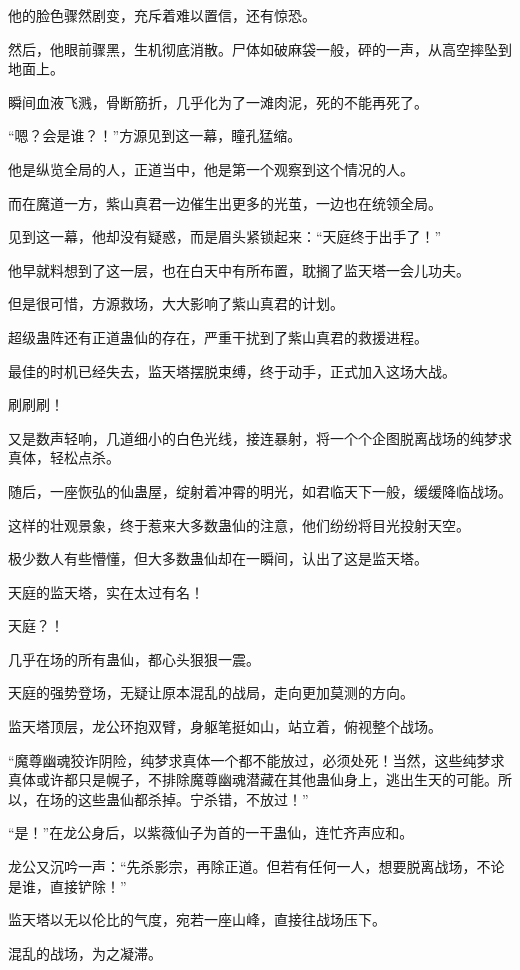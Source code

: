 \begin{this_body}
他的脸色骤然剧变，充斥着难以置信，还有惊恐。

然后，他眼前骤黑，生机彻底消散。尸体如破麻袋一般，砰的一声，从高空摔坠到地面上。

瞬间血液飞溅，骨断筋折，几乎化为了一滩肉泥，死的不能再死了。

“嗯？会是谁？！”方源见到这一幕，瞳孔猛缩。

他是纵览全局的人，正道当中，他是第一个观察到这个情况的人。

而在魔道一方，紫山真君一边催生出更多的光茧，一边也在统领全局。

见到这一幕，他却没有疑惑，而是眉头紧锁起来：“天庭终于出手了！”

他早就料想到了这一层，也在白天中有所布置，耽搁了监天塔一会儿功夫。

但是很可惜，方源救场，大大影响了紫山真君的计划。

超级蛊阵还有正道蛊仙的存在，严重干扰到了紫山真君的救援进程。

最佳的时机已经失去，监天塔摆脱束缚，终于动手，正式加入这场大战。

刷刷刷！

又是数声轻响，几道细小的白色光线，接连暴射，将一个个企图脱离战场的纯梦求真体，轻松点杀。

随后，一座恢弘的仙蛊屋，绽射着冲霄的明光，如君临天下一般，缓缓降临战场。

这样的壮观景象，终于惹来大多数蛊仙的注意，他们纷纷将目光投射天空。

极少数人有些懵懂，但大多数蛊仙却在一瞬间，认出了这是监天塔。

天庭的监天塔，实在太过有名！

天庭？！

几乎在场的所有蛊仙，都心头狠狠一震。

天庭的强势登场，无疑让原本混乱的战局，走向更加莫测的方向。

监天塔顶层，龙公环抱双臂，身躯笔挺如山，站立着，俯视整个战场。

“魔尊幽魂狡诈阴险，纯梦求真体一个都不能放过，必须处死！当然，这些纯梦求真体或许都只是幌子，不排除魔尊幽魂潜藏在其他蛊仙身上，逃出生天的可能。所以，在场的这些蛊仙都杀掉。宁杀错，不放过！”

“是！”在龙公身后，以紫薇仙子为首的一干蛊仙，连忙齐声应和。

龙公又沉吟一声：“先杀影宗，再除正道。但若有任何一人，想要脱离战场，不论是谁，直接铲除！”

监天塔以无以伦比的气度，宛若一座山峰，直接往战场压下。

混乱的战场，为之凝滞。


\end{this_body}
